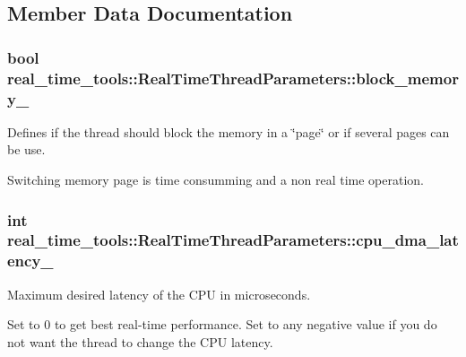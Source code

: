 \subsection{Member Data Documentation}
\subsubsection[{\texorpdfstring{block\+\_\+memory\+\_\+}{block_memory_}}]{\setlength{\rightskip}{0pt plus 5cm}bool real\+\_\+time\+\_\+tools\+::\+Real\+Time\+Thread\+Parameters\+::block\+\_\+memory\+\_\+}\hypertarget{classreal__time__tools_1_1RealTimeThreadParameters_a134856e17552d3f31a093f3a1f5d1639}{}\label{classreal__time__tools_1_1RealTimeThreadParameters_a134856e17552d3f31a093f3a1f5d1639}


Defines if the thread should block the memory in a \char`\"{}page\char`\"{} or if several pages can be use. 

Switching memory page is time consumming and a non real time operation. 
\subsubsection[{\texorpdfstring{cpu\+\_\+dma\+\_\+latency\+\_\+}{cpu_dma_latency_}}]{\setlength{\rightskip}{0pt plus 5cm}int real\+\_\+time\+\_\+tools\+::\+Real\+Time\+Thread\+Parameters\+::cpu\+\_\+dma\+\_\+latency\+\_\+}\hypertarget{classreal__time__tools_1_1RealTimeThreadParameters_afc9891b44025aab8b383e91d907d41b0}{}\label{classreal__time__tools_1_1RealTimeThreadParameters_afc9891b44025aab8b383e91d907d41b0}


Maximum desired latency of the C\+PU in microseconds. 

Set to 0 to get best real-\/time performance. Set to any negative value if you do not want the thread to change the C\+PU latency. 
